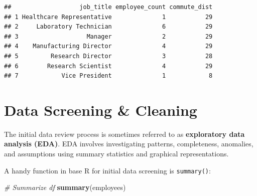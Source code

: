 \documentclass[]{book}
\newenvironment{Shaded}{\begin{snugshade}}{\end{snugshade}}
\newcommand{\CommentTok}[1]{\textcolor[rgb]{0.56,0.35,0.01}{\textit{#1}}}
\newcommand{\KeywordTok}[1]{\textcolor[rgb]{0.13,0.29,0.53}{\textbf{#1}}}
\newcommand{\NormalTok}[1]{#1}
\begin{document}
\begin{verbatim}
##                   job_title employee_count commute_dist
## 1 Healthcare Representative              1           29
## 2     Laboratory Technician              6           29
## 3                   Manager              2           29
## 4    Manufacturing Director              4           29
## 5         Research Director              3           28
## 6        Research Scientist              4           29
## 7            Vice President              1            8
\end{verbatim}

\hypertarget{data-screening-cleaning}{%
\section{Data Screening \& Cleaning}\label{data-screening-cleaning}}

The initial data review process is sometimes referred to as \textbf{exploratory data analysis (EDA)}. EDA involves investigating patterns, completeness, anomalies, and assumptions using summary statistics and graphical representations.

A handy function in base R for initial data screening is \texttt{summary()}:

\begin{Shaded}
\begin{Highlighting}[]
\CommentTok{# Summarize df}
\KeywordTok{summary}\NormalTok{(employees)}
\end{Highlighting}
\end{Shaded}
\end{document}
